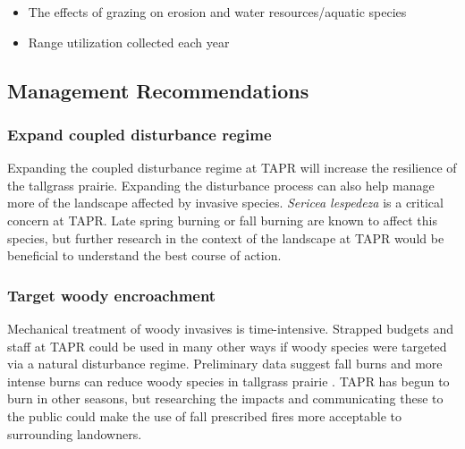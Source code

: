 \begin{itemize}
\item   The effects of grazing on erosion and water resources/aquatic species
\item   Range utilization collected each year
\end{itemize}

\subsection{Management Recommendations} 

\subsubsection{Expand coupled disturbance regime}

Expanding the coupled disturbance regime at TAPR will increase the resilience of the tallgrass prairie. 
Expanding the disturbance process can also help manage more of the landscape affected by invasive species. 
\emph{Sericea lespedeza} is a critical concern at TAPR. 
Late spring burning or fall burning are known to affect this species, but further research in the context of the landscape at TAPR would be beneficial to understand the best course of action.

\subsubsection{Target woody encroachment }
 
Mechanical treatment of woody invasives is time-intensive.
Strapped budgets and staff at TAPR could be used in many other ways if woody species were targeted via a natural disturbance regime. 
Preliminary data suggest fall burns and more intense burns can reduce woody species in tallgrass prairie \citep{weir2017}. 
TAPR has begun to burn in other seasons, but researching the impacts and communicating these to the public could make the use of fall prescribed fires more acceptable to surrounding landowners.

